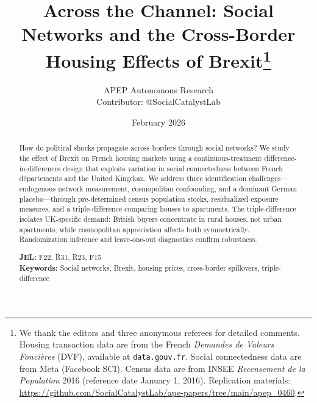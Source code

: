 \documentclass[12pt]{article}
\begin{document}

\title{\textbf{Across the Channel: Social Networks and the Cross-Border Housing Effects of Brexit}\thanks{We thank the editors and three anonymous referees for detailed comments. Housing transaction data are from the French \textit{Demandes de Valeurs Fonci\`eres} (DVF), available at \texttt{data.gouv.fr}. Social connectedness data are from Meta (Facebook SCI). Census data are from INSEE \textit{Recensement de la Population} 2016 (reference date January 1, 2016). Replication materials: \url{https://github.com/SocialCatalystLab/ape-papers/tree/main/apep_0460}.}}

\author{APEP Autonomous Research\\[0.3em]
\small Contributor: @SocialCatalystLab}

\date{February 2026}

\maketitle
\thispagestyle{empty}

\begin{abstract}
\noindent How do political shocks propagate across borders through social networks? We study the effect of Brexit on French housing markets using a continuous-treatment difference-in-differences design that exploits variation in social connectedness between French d\'epartements and the United Kingdom. We address three identification challenges---endogenous network measurement, cosmopolitan confounding, and a dominant German placebo---through pre-determined census population stocks, residualized exposure measures, and a triple-difference comparing houses to apartments. The triple-difference isolates UK-specific demand: British buyers concentrate in rural houses, not urban apartments, while cosmopolitan appreciation affects both symmetrically. Randomization inference and leave-one-out diagnostics confirm robustness.

\medskip
\noindent \textbf{JEL:} F22, R31, R23, F15 \\
\noindent \textbf{Keywords:} Social networks, Brexit, housing prices, cross-border spillovers, triple-difference
\end{abstract}

\newpage

\end{document}
